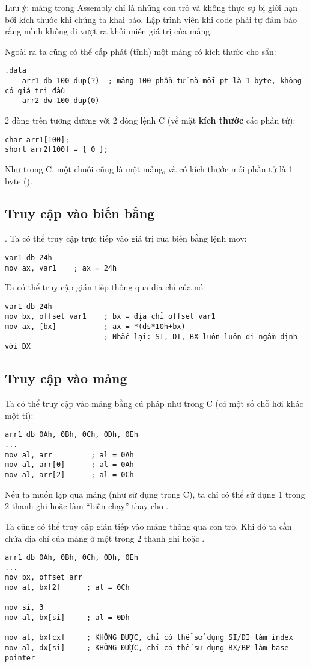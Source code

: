 \documentclass[main.tex]{subfiles}
\begin{document}
Lưu ý: mảng trong Assembly chỉ là những con trỏ và không thực sự bị giới hạn bởi kích thước khi chúng ta khai báo. Lập trình viên khi code phải tự đảm bảo rằng mình không đi vượt ra khỏi miền giá trị của mảng.

Ngoài ra ta cũng có thể cấp phát (tĩnh) một mảng có kích thước cho sẵn:
\begin{verbatim}
.data
    arr1 db 100 dup(?)  ; mảng 100 phần tử mà mỗi pt là 1 byte, không có giá trị đầu
    arr2 dw 100 dup(0)
\end{verbatim}
2 dòng trên tương đương với 2 dòng lệnh C (về mặt \textbf{kích thước} các phần tử):
\begin{verbatim}
char arr1[100];
short arr2[100] = { 0 }; 
\end{verbatim}

Như trong C, một chuỗi cũng là một mảng, và có kích thước mỗi phần tử là 1 byte ().

\subsection{Truy cập vào biến bằng }.
Ta có thể truy cập trực tiếp vào giá trị của biến bằng lệnh mov:
\begin{verbatim}
var1 db 24h
mov ax, var1    ; ax = 24h
\end{verbatim}
Ta có thể truy cập gián tiếp thông qua địa chỉ của nó:
\begin{verbatim}
var1 db 24h            
mov bx, offset var1    ; bx = địa chỉ offset var1
mov ax, [bx]           ; ax = *(ds*10h+bx) 
                       ; Nhắc lại: SI, DI, BX luôn luôn đi ngầm định với DX
\end{verbatim}

\subsection{Truy cập vào mảng} \label{subsec:truycapmang}
Ta có thể truy cập vào mảng bằng cú pháp như trong C (có một số chỗ hơi khác một tí):
\begin{verbatim}
arr1 db 0Ah, 0Bh, 0Ch, 0Dh, 0Eh 
... 
mov al, arr         ; al = 0Ah 
mov al, arr[0]      ; al = 0Ah 
mov al, arr[2]      ; al = 0Ch 
\end{verbatim}
Nếu ta muốn lặp qua mảng (như sử dụng  trong C), ta chỉ có thể sử dụng 1 trong 2 thanh ghi  hoặc  làm ``biến chạy'' thay cho .

Ta cũng có thể truy cập gián tiếp vào mảng thông qua con trỏ. Khi đó ta cần chứa địa chỉ của mảng ở một trong 2 thanh ghi  hoặc .
\begin{verbatim}
arr1 db 0Ah, 0Bh, 0Ch, 0Dh, 0Eh 
... 
mov bx, offset arr 
mov al, bx[2]      ; al = 0Ch 

mov si, 3
mov al, bx[si]     ; al = 0Dh 

mov al, bx[cx]     ; KHÔNG ĐƯỢC, chỉ có thể sử dụng SI/DI làm index 
mov al, dx[si]     ; KHÔNG ĐƯỢC, chỉ có thể sử dụng BX/BP làm base pointer
\end{verbatim}
\end{document}
